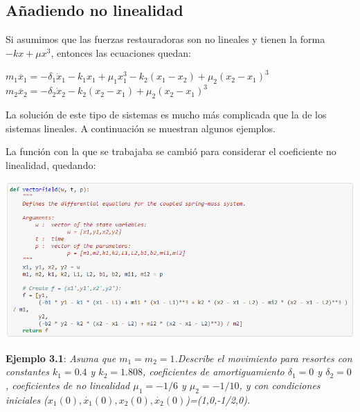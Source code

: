 \documentclass{article}
\begin{document}
\subsection{Añadiendo no linealidad}
Si asumimos que las fuerzas restauradoras son no lineales y tienen la forma $-kx+\mu x^{3}$, entonces las ecuaciones quedan:
\begin{center}
$m_{1}\ddot{x_{1}}=-\delta_{1} \dot{x}_{1}-k_{1}x_{1}+\mu_{1} x^{3}_{1}-k_{2}(x_{1}-x_{2})+\mu_{2} (x_{2}-x_{1})^{3}$ \\
$m_{2}\ddot{x_{2}}=-\delta_{2} \dot{x}_{2}-k_{2}(x_{2}-x_{1})+\mu_{2} (x_{2}-x_{1})^{3}$
\end{center}
La solución de este tipo de sistemas es mucho más complicada que la de los sistemas lineales. A continuación se muestran algunos ejemplos.

La función con la que se trabajaba se cambió para considerar el coeficiente no linealidad, quedando:

\begin{center}
    \includegraphics[width=.9\textwidth]{Fun3.PNG}
\end{center}

\textbf{Ejemplo 3.1}:\textsl{ Asuma que $m_{1}=m_{2}=1$.Describe el movimiento para resortes con constantes $k_{1}=0.4$ y $k_{2}=1.808$, coeficientes de amortiguamiento $\delta_{1}=0$ y $\delta_{2}=0$, coeficientes de no linealidad $\mu_{1}=-1/6$ y $\mu_{2}=-1/10$, y con condiciones iniciales ($x_{1}(0),\dot{x_{1}}(0), x_{2}(0),\dot{x_{2}}(0)$)=(1,0,-1/2,0).}
\end{document}
